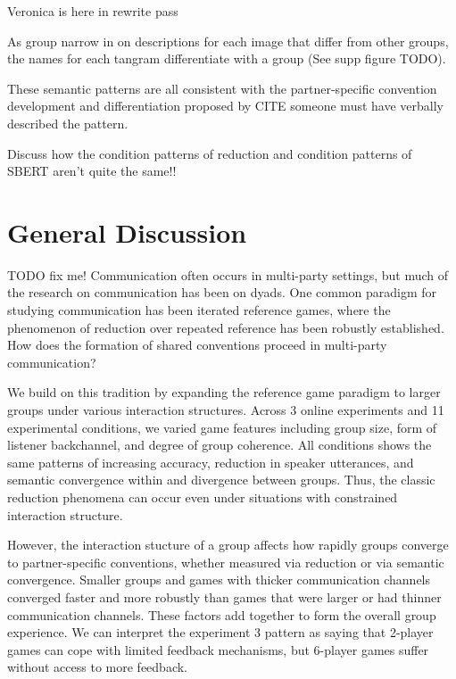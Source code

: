 \documentclass[
  english,
  a4paper,
]{article}
\begin{document}
Veronica is here in rewrite pass

As group narrow in on descriptions for each image that differ from other groups, the names for each tangram differentiate with a group (See supp figure TODO).

These semantic patterns are all consistent with the partner-specific convention development and differentiation proposed by CITE someone must have verbally described the pattern.

Discuss how the condition patterns of reduction and condition patterns of SBERT aren't quite the same!!

\hypertarget{general-discussion}{%
\section{General Discussion}\label{general-discussion}}

TODO fix me!
Communication often occurs in multi-party settings, but much of the research on communication has been on dyads. One common paradigm for studying communication has been iterated reference games, where the phenomenon of reduction over repeated reference has been robustly established. How does the formation of shared conventions proceed in multi-party communication?

We build on this tradition by expanding the reference game paradigm to larger groups under various interaction structures. Across 3 online experiments and 11 experimental conditions, we varied game features including group size, form of listener backchannel, and degree of group coherence. All conditions shows the same patterns of increasing accuracy, reduction in speaker utterances, and semantic convergence within and divergence between groups. Thus, the classic reduction phenomena can occur even under situations with constrained interaction structure.

However, the interaction stucture of a group affects how rapidly groups converge to partner-specific conventions, whether measured via reduction or via semantic convergence. Smaller groups and games with thicker communication channels converged faster and more robustly than games that were larger or had thinner communication channels. These factors add together to form the overall group experience. We can interpret the experiment 3 pattern as saying that 2-player games can cope with limited feedback mechanisms, but 6-player games suffer without access to more feedback.
\end{document}
